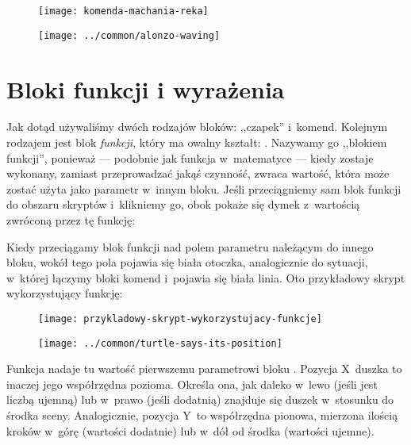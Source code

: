 \documentclass{report}
\begin{document}
\begin{figure}[H]
\begin{minipage}{0.3\textwidth}
\texttt{[image: komenda-machania-reka]}
\end{minipage}%
\begin{minipage}{0.3\textwidth}
\texttt{[image: ../common/alonzo-waving]}
\end{minipage}
\end{figure}

\section{Bloki funkcji i wyrażenia}

Jak dotąd używaliśmy dwóch rodzajów bloków: ,,czapek'' i~komend. Kolejnym rodzajem jest blok \emph{funkcji}, który ma owalny kształt: . Nazywamy go ,,blokiem funkcji'', ponieważ --- podobnie jak funkcja w~matematyce --- kiedy zostaje wykonany, zamiast przeprowadzać jakąś czynność, zwraca wartość, która może zostać użyta jako parametr w~innym bloku. Jeśli przeciągniemy sam blok funkcji do obszaru skryptów i~klikniemy go, obok pokaże się dymek z~wartością zwróconą przez tę funkcję:


Kiedy przeciągamy blok funkcji nad polem parametru należącym do innego bloku, wokół tego pola pojawia się biała otoczka, analogicznie do sytuacji, w~której łączymy bloki komend i~pojawia się biała linia. Oto przykładowy skrypt wykorzystujący funkcję:

\begin{figure}[H]
\begin{minipage}{0.4\textwidth}
\texttt{[image: przykladowy-skrypt-wykorzystujacy-funkcje]}
\end{minipage}%
\begin{minipage}{0.6\textwidth}
\texttt{[image: ../common/turtle-says-its-position]}
\end{minipage}
\end{figure}

Funkcja  nadaje tu wartość pierwszemu parametrowi bloku . Pozycja X~duszka to inaczej jego współrzędna pozioma. Określa ona, jak daleko w~lewo (jeśli jest liczbą ujemną) lub w~prawo (jeśli dodatnią) znajduje się duszek w~stosunku do środka sceny. Analogicznie, pozycja Y~to współrzędna pionowa, mierzona ilością kroków w~górę (wartości dodatnie) lub w~dół od środka (wartości ujemne).
\end{document}
